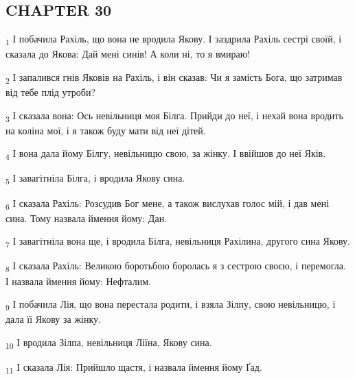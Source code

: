 \subsection{CHAPTER 30}
\begin{tcolorbox}
\textsubscript{1} І побачила Рахіль, що вона не вродила Якову. І заздрила Рахіль сестрі своїй, і сказала до Якова: Дай мені синів! А коли ні, то я вмираю!
\end{tcolorbox}
\begin{tcolorbox}
\textsubscript{2} І запалився гнів Яковів на Рахіль, і він сказав: Чи я замість Бога, що затримав від тебе плід утроби?
\end{tcolorbox}
\begin{tcolorbox}
\textsubscript{3} І сказала вона: Ось невільниця моя Білга. Прийди до неї, і нехай вона вродить на коліна мої, і я також буду мати від неї дітей.
\end{tcolorbox}
\begin{tcolorbox}
\textsubscript{4} І вона дала йому Білгу, невільницю свою, за жінку. І ввійшов до неї Яків.
\end{tcolorbox}
\begin{tcolorbox}
\textsubscript{5} І завагітніла Білга, і вродила Якову сина.
\end{tcolorbox}
\begin{tcolorbox}
\textsubscript{6} І сказала Рахіль: Розсудив Бог мене, а також вислухав голос мій, і дав мені сина. Тому назвала ймення йому: Дан.
\end{tcolorbox}
\begin{tcolorbox}
\textsubscript{7} І завагітніла вона ще, і вродила Білга, невільниця Рахілина, другого сина Якову.
\end{tcolorbox}
\begin{tcolorbox}
\textsubscript{8} І сказала Рахіль: Великою боротьбою боролась я з сестрою своєю, і перемогла. І назвала ймення йому: Нефталим.
\end{tcolorbox}
\begin{tcolorbox}
\textsubscript{9} І побачила Лія, що вона перестала родити, і взяла Зілпу, свою невільницю, і дала її Якову за жінку.
\end{tcolorbox}
\begin{tcolorbox}
\textsubscript{10} І вродила Зілпа, невільниця Ліїна, Якову сина.
\end{tcolorbox}
\begin{tcolorbox}
\textsubscript{11} І сказала Лія: Прийшло щастя, і назвала ймення йому Ґад.
\end{tcolorbox}
